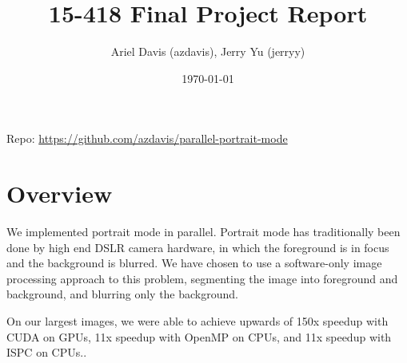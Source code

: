 \documentclass[12pt]{article}
\author{Ariel Davis (azdavis), Jerry Yu (jerryy)}
\date{\today}
\title{15-418 Final Project Report}
\begin{document}
\maketitle

Repo: \url{https://github.com/azdavis/parallel-portrait-mode}

\section{Overview}

We implemented portrait mode in parallel. Portrait mode has traditionally been
done by high end DSLR camera hardware, in which the foreground is in focus and
the background is blurred. We have chosen to use a software-only image
processing approach to this problem, segmenting the image into foreground and
background, and blurring only the background.

On our largest images, we were able to achieve upwards of 150x speedup with
CUDA on GPUs, 11x speedup with OpenMP on CPUs, and 11x speedup with ISPC on
CPUs..
\end{document}
